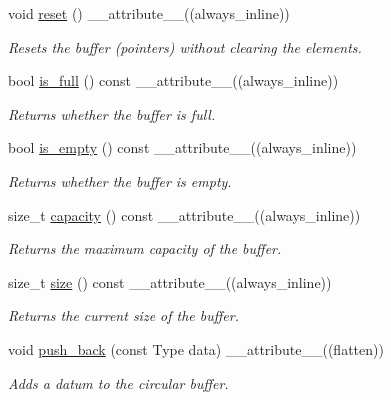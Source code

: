 \begin{DoxyCompactItemize}
\item 
void \hyperlink{classCircular__Buffer_a902eea867fd0c933af19b91f9b97ccee}{reset} () \+\_\+\+\_\+attribute\+\_\+\+\_\+((always\+\_\+inline))
\begin{DoxyCompactList}\small\item\em Resets the buffer (pointers) without clearing the elements. \end{DoxyCompactList}\item 
bool \hyperlink{classCircular__Buffer_a5d5ae2d1423cb1e5fc8e4e05d356cdca}{is\+\_\+full} () const \+\_\+\+\_\+attribute\+\_\+\+\_\+((always\+\_\+inline))
\begin{DoxyCompactList}\small\item\em Returns whether the buffer is full. \end{DoxyCompactList}\item 
bool \hyperlink{classCircular__Buffer_af2251f79c1509b7c1af0354ff7ac11fb}{is\+\_\+empty} () const \+\_\+\+\_\+attribute\+\_\+\+\_\+((always\+\_\+inline))
\begin{DoxyCompactList}\small\item\em Returns whether the buffer is empty. \end{DoxyCompactList}\item 
size\+\_\+t \hyperlink{classCircular__Buffer_ad5ffdcccb9212547871ea6c1e399caca}{capacity} () const \+\_\+\+\_\+attribute\+\_\+\+\_\+((always\+\_\+inline))
\begin{DoxyCompactList}\small\item\em Returns the maximum capacity of the buffer. \end{DoxyCompactList}\item 
size\+\_\+t \hyperlink{classCircular__Buffer_a94a93c974e51a8a7ac9cefdfe896aaac}{size} () const \+\_\+\+\_\+attribute\+\_\+\+\_\+((always\+\_\+inline))
\begin{DoxyCompactList}\small\item\em Returns the current size of the buffer. \end{DoxyCompactList}\item 
void \hyperlink{classCircular__Buffer_a2271c0b158052ae6491972ce7237f888}{push\+\_\+back} (const Type data) \+\_\+\+\_\+attribute\+\_\+\+\_\+((flatten))
\begin{DoxyCompactList}\small\item\em Adds a datum to the circular buffer. \end{DoxyCompactList}\item 

\end{DoxyCompactItemize}
